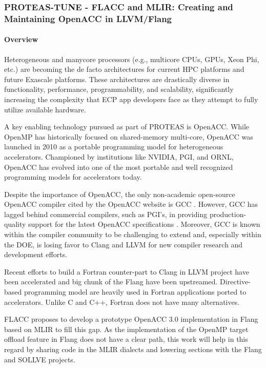 \subsubsection{ PROTEAS-TUNE - FLACC and MLIR: Creating and Maintaining OpenACC in LLVM/Flang}\label{s:flacc}

\paragraph{Overview}
Heterogeneous and manycore processors (e.g., multicore CPUs, GPUs,
Xeon Phi, etc.) are becoming the de facto architectures for current
HPC platforms and future Exascale platforms.  These architectures are
drastically diverse in functionality, performance, programmability,
and scalability, significantly increasing the complexity that ECP app
developers face as they attempt to fully utilize available hardware.

A key enabling technology pursued as part of PROTEAS is OpenACC.
While OpenMP has historically focused on shared-memory multi-core,
OpenACC was launched in 2010 as a portable programming model for
heterogeneous accelerators.  Championed by institutions like NVIDIA,
PGI, and ORNL, OpenACC has evolved into one of the most portable and
well recognized programming models for accelerators today.

Despite the importance of OpenACC, the only non-academic open-source OpenACC
compiler cited by the OpenACC website is GCC \cite{openaccOrgTools}.
However, GCC has lagged behind commercial compilers, such as PGI's, in
providing production-quality support for the latest OpenACC specifications
\cite{openACCValidationSuite}.  Moreover, GCC is known within the compiler
community to be challenging to extend and, especially within the DOE, is
losing favor to Clang and LLVM for new compiler research and development
efforts.

Recent efforts to build a Fortran counter-part to Clang in LLVM project have
been accelerated and big chunk of the Flang have been upstreamed.
Directive-based programming model are heavily used in Fortran applications ported
to accelerators. Unlike C and C++, Fortran does not have many alternatives.

FLACC proposes to develop a prototype OpenACC 3.0 implementation in Flang based
on MLIR to fill this gap. As the implementation of the OpenMP target offload
feature in Flang does not have a clear path, this work will help in this regard
by sharing code in the MLIR dialects and lowering sections with the Flang and
SOLLVE projects.

